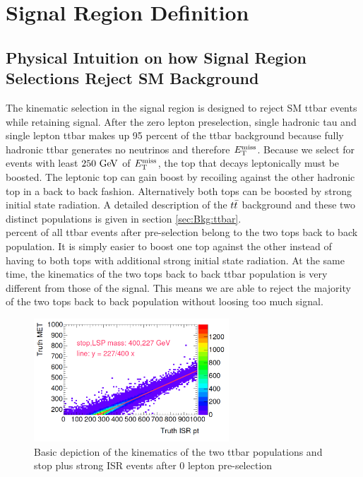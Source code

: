 
\chapter{Signal Region Definition}
\label{chap:SignalRegion}

\section{Physical Intuition on how Signal Region Selections Reject SM Background}
\label{sec:SR:Selections}

\indent The kinematic selection in the signal region is designed to reject SM ttbar events while retaining signal.  After the zero lepton preselection, single hadronic tau and single lepton ttbar makes up 95 percent of the ttbar background because fully hadronic ttbar generates no neutrinos and therefore $E_{\mathrm{T}}^{\mathrm{miss}}$.   Because we select for events with least $250 \gev$ of $E_{\mathrm{T}}^{\mathrm{miss}}$, the top that decays leptonically must be boosted.  The leptonic top can gain boost by recoiling against the other hadronic top in a back to back fashion.  Alternatively both tops can be boosted by strong initial state radiation.   A detailed description of the $t\bar{t}$ background and these two distinct populations is given in section \ref{sec:Bkg:ttbar}.  \\

 percent of all ttbar events after pre-selection belong to the two tops back to back population.  It is simply easier to boost one top against the other instead of having to both tops with additional strong initial state radiation.  At the same time, the kinematics of the two tops back to back ttbar population is very different from those of the signal.  This means we are able to reject the majority of the two tops back to back population without loosing too much signal. \\

\begin{figure}[h!]
  \centering
	\includegraphics[width=0.65\textwidth]{./figures/MET_ISR.png}
\caption{\label{fig:ttbar:3pop}{Basic depiction of the kinematics of the two ttbar populations and stop plus strong ISR events after 0 lepton pre-selection }}
\end{figure}

